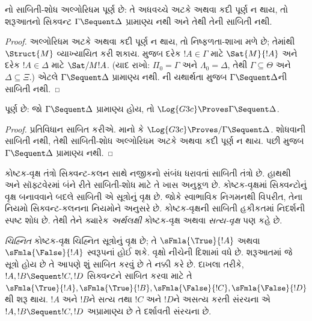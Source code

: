 \begin{cor}
નો
સાબિતી-શોધ
અલ્ગોરિધમ પૂર્ણ
છે: તે અધવચ્ચે
અટકે અથવા
કદી પૂર્ણ ન
થાય, તો શરૂઆતનો
સિક્વન્ટ
$\Gamma \Sequent \Delta$
પ્રામાણ્ય નથી
અને તેથી
તેની સાબિતી
નથી.
\end{cor}

\begin{proof}
  અલ્ગોરિધમ
  અટકે અથવા
  કદી પૂર્ણ ન
  થાય, તો
  નિષ્ફળતા-શાખા
  મળે છે;
  તેમાંથી
  $\Struct{M}$
  વ્યાખ્યાયિત
  કરી શકાય.
  મુજબ દરેક
  $!A \in \Gamma$
  માટે
  $\Sat{M}{!A}$
  અને દરેક
  $!A \in \Delta$
  માટે
  $\Sat/{M}{!A}$.
  (યાદ રાખો:
  $\Pi_0 = \Gamma$
  અને
  $\Lambda_0 =
  \Delta$,
  તેથી
  $\Gamma \subseteq \Theta$
  અને
  $\Delta \subseteq \Xi$.)
  એટલે
  $\Gamma \Sequent \Delta$
  પ્રામાણ્ય નથી.
  ની
  યથાર્થતા મુજબ
  $\Gamma \Sequent \Delta$ની
  સાબિતી
  નથી.
\end{proof}

\begin{cor}
પૂર્ણ છે: જો
$\Gamma \Sequent \Delta$
પ્રામાણ્ય હોય, તો
$\Log{G3c} \Proves \Gamma \Sequent \Delta$.
\end{cor}

\begin{proof}
  પ્રતિવિધાન
  સાબિત કરીએ.
  માનો કે
  $\Log{G3c} \Proves/ \Gamma
  \Sequent \Delta$.
  શોધવાની
  સાબિતી
  નથી, તેથી
  સાબિતી-શોધ
  અલ્ગોરિધમ
  અટકે અથવા
  કદી પૂર્ણ ન
  થાય. પછી
  મુજબ
  $\Gamma \Sequent \Delta$
  પ્રામાણ્ય નથી.
\end{proof}
\endgroup

\begingroup
\makeatletter{}\makeatother


\label{guunit:OLP-0684}


કોષ્ટક-વૃક્ષ તંત્રો સિક્વન્ટ-કલન સાથે નજીકનો સંબંધ ધરાવતાં
સાબિતી તંત્રો છે. હાથથી અને સૉફ્ટવેરમાં બંને રીતે
સાબિતી-શોધ માટે તે ખાસ અનુકૂળ છે. કોષ્ટક-વૃક્ષમાં
સિક્વન્ટોનું વૃક્ષ બનાવવાને બદલે સાબિતી એ
સૂત્રોનું વૃક્ષ છે. જોકે સ્વાભાવિક નિગમનથી
વિપરીત, તેના નિયમો સિક્વન્ટ-કલનના નિયમોને અનુસરે છે.
કોષ્ટક-વૃક્ષની સાબિતી હકીકતમાં નિદર્શની સ્પષ્ટ શોધ
છે. તેથી તેને ક્યારેક \emph{અર્થલક્ષી} કોષ્ટક-વૃક્ષ
અથવા \emph{સત્ય-વૃક્ષ} પણ કહે છે.

\emph{ચિહ્નિત} કોષ્ટક-વૃક્ષ ચિહ્નિત સૂત્રોનું
વૃક્ષ છે; તે $\sFmla{\True}{!A}$ અથવા
$\sFmla{\False}{!A}$ સ્વરૂપનાં હોઈ શકે.
વૃક્ષો નીચેની દિશામાં વધે છે. શરૂઆતમાં જે
સૂત્રો હોય છે તે આપણે શું સાબિત કરવું છે
તે નક્કી કરે છે. દાખલા તરીકે,
$!A, !B \Sequent !C, !D$ સિક્વન્ટને સાબિત
કરવા માટે તે
$\sFmla{\True}{!A}, \sFmla{\True}{!B},
\sFmla{\False}{!C}, \sFmla{\False}{!D}$થી
શરૂ થાય.
$!A$ અને $!B$ને સત્ય તથા $!C$ અને $!D$ને
અસત્ય કરતી સંરચના એ
$!A, !B \Sequent !C, !D$ અપ્રામાણ્ય છે તે
દર્શાવતી સંરચના છે.

